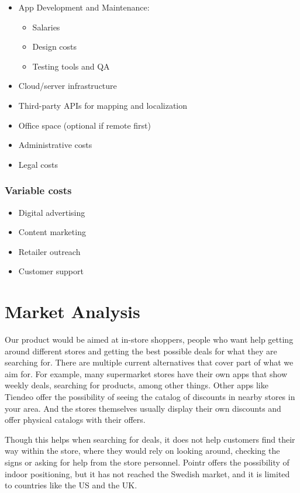 \documentclass[titlepage]{article}
\begin{document}
\begin{itemize}
  \item App Development and Maintenance:
  \begin{itemize}
    \item Salaries
    \item Design costs
    \item Testing tools and QA
  \end{itemize}
    \item Cloud/server infrastructure
    \item Third-party APIs for mapping and localization
    \item Office space (optional if remote first)
    \item Administrative costs
    \item Legal costs
  \end{itemize}
  \subsubsection{Variable costs}
  \begin{itemize}
    \item Digital advertising
    \item Content marketing
    \item Retailer outreach
    \item Customer support
  \end{itemize}

\section{Market Analysis}

Our product would be aimed at in-store shoppers, people who want help getting around different stores and getting the best possible deals for what they are searching for. There are multiple current alternatives that cover part of what we aim for. For example, many supermarket stores have their own apps that show weekly deals, searching for products, among other things. Other apps like Tiendeo offer the possibility of seeing the catalog of discounts in nearby stores in your area. And the stores themselves usually display their own discounts and offer physical catalogs with their offers. 

Though this helps when searching for deals, it does not help customers find their way within the store, where they would rely on looking around, checking the signs or asking for help from the store personnel. Pointr offers the possibility of indoor positioning, but it has not reached the Swedish market, and it is limited to countries like the US and the UK. 
\end{document}
